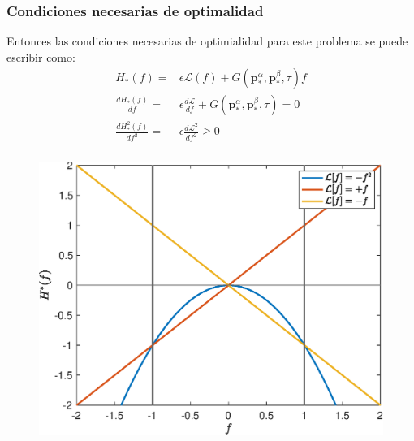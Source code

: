 \begin{frame}
    \frametitle{Condiciones necesarias de optimalidad}
    Entonces las condiciones necesarias de optimialidad para este problema se puede escribir como:
    \begin{align}\label{hamil}
        H_*(f) = & \epsilon \mathcal{L}(f) + 
        G(\bm{p}^\alpha_*,\bm{p}^\beta_*,\tau) f \\
        \frac{dH_*(f)}{df} =  & \epsilon\frac{d\mathcal{L}}{df} + G(\bm{p}^\alpha_*,\bm{p}^\beta_*,\tau) = 0\\
        \frac{dH_*^2(f)}{df^2} = &  \epsilon \frac{d\mathcal{L}^2}{df^2}\geq 0 
    \end{align}

\end{frame}

\begin{frame}
    \frametitle{}
    \begin{figure}
        \includegraphics[scale=0.45]{imgs/bang-bang.eps}
    \end{figure}
\end{frame}
